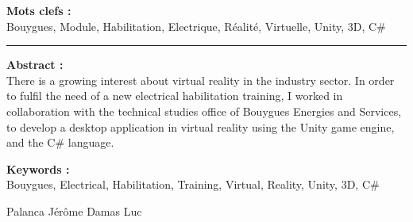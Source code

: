 \documentclass[a4paper]{article}
\begin{document}
    \vfill 
    \begin{flushleft}
    \huge \textbf{Mots clefs : } \vspace{2pt} \\
    \vspace{10pt}
    \normalsize Bouygues, Module, Habilitation, Electrique, Réalité, Virtuelle, Unity, 3D, C\#
    \end{flushleft}

    \noindent\rule{0.725\paperwidth}{0.4pt}
    
    \vfill 
    \begin{flushleft}
    \huge \textbf{Abstract : } \\
    \vspace{10pt}
    \normalsize There is a growing interest about virtual reality in the industry sector. In order to fulfil the need of a new electrical habilitation training, I worked in collaboration with the technical studies office of Bouygues Energies and Services, to develop a desktop application in virtual reality using the Unity game engine, and the C\# language.
    \end{flushleft}
    
    \vfill 
    \begin{flushleft}
    \huge \textbf{Keywords : } \\
    \vspace{10pt}
    \normalsize Bouygues, Electrical, Habilitation, Training, Virtual, Reality, Unity, 3D, C\#
    \end{flushleft}

	\vfill
    Palanca Jérôme \hfill Damas Luc
\end{document}
